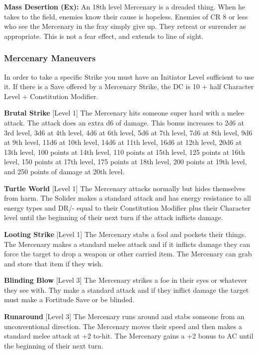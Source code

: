 \textbf{Mass Desertion (Ex):} An 18th level Mercenary is a dreaded thing. When he takes to the field, enemies know their cause is hopeless. Enemies of CR 8 or less who see the Mercenary in the fray simply give up. They retreat or surrender as appropriate. This is not a fear effect, and extends to line of sight.

\subsubsection{Mercenary Maneuvers}

In order to take a specific Strike you must have an Initiator Level sufficient to use it. If there is a Save offered by a Mercenary Strike, the DC is 10 + half Character Level + Constitution Modifier.

\newcommand{\mercenarymaneuver}[3]{\textbf{#1} [Level #2] #3\medskip{}}

\mercenarymaneuver{Brutal Strike}{1}{The Mercenary hits someone super hard with a melee attack. The attack does an extra d6 of damage. This bonus increases to 2d6 at 3rd level, 3d6 at 4th level, 4d6 at 6th level, 5d6 at 7th level, 7d6 at 8th level, 9d6 at 9th level, 11d6 at 10th level, 14d6 at 11th level, 16d6 at 12th level, 20d6 at 13th level, 100 points at 14th level, 110 points at 15th level, 125 points at 16th level, 150 points at 17th level, 175 points at 18th level, 200 points at 19th level, and 250 points of damage at 20th level.}

\mercenarymaneuver{Turtle World}{1}{The Mercenary attacks normally but hides themselves from harm. The Solider makes a standard attack and has energy resistance to all energy types and DR/- equal to their Constitution Modifier plus their Character level until the beginning of their next turn if the attack inflicts damage.}

\mercenarymaneuver{Looting Strike}{1}{The Mercenary stabs a fool and pockets their things. The Mercenary makes a standard melee attack and if it inflicts damage they can force the target to drop a weapon or other carried item. The Mercenary can grab and store that item if they wish.}

\mercenarymaneuver{Blinding Blow}{3}{The Mercenary strikes a foe in their eyes or whatever they see with. Thy make a standard attack and if they inflict damage the target must make a Fortitude Save or be blinded.}

\mercenarymaneuver{Runaround}{3}{The Mercenary runs around and stabs someone from an unconventional direction. The Mercenary moves their speed and then makes a standard melee attack at +2 to-hit. The Mercenary gains a +2 bonus to AC until the beginning of their next turn.}

